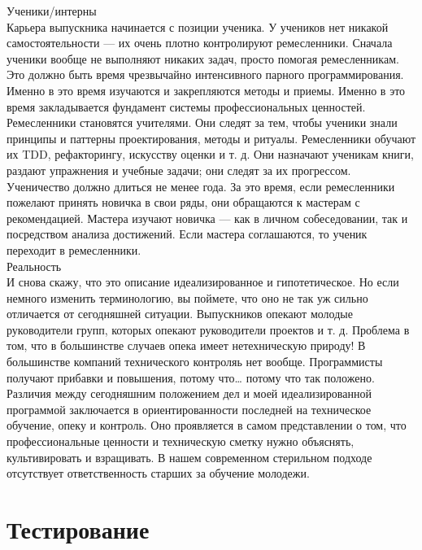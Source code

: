 \documentclass{../industrial-development}
\begin{document}
Ученики/интерны\\
Карьера выпускника начинается с позиции ученика. У учеников нет никакой самостоятельности — их очень плотно контролируют ремесленники. Сначала ученики вообще не выполняют никаких задач, просто помогая ремесленникам. Это должно быть время чрезвычайно интенсивного парного программирования. Именно в это время изучаются и закрепляются методы и приемы. Именно в это время закладывается фундамент системы профессиональных ценностей.\\
Ремесленники становятся учителями. Они следят за тем, чтобы ученики знали принципы и паттерны проектирования, методы и ритуалы. Ремесленники обучают их TDD, рефакторингу, искусству оценки и т. д. Они назначают ученикам книги, раздают упражнения и учебные задачи; они следят за их прогрессом.\\
Ученичество должно длиться не менее года. За это время, если ремесленники пожелают принять новичка в свои ряды, они обращаются к мастерам с рекомендацией. Мастера изучают новичка — как в личном собеседовании, так и посредством анализа достижений. Если мастера соглашаются, то ученик переходит в ремесленники.\\
Реальность\\
И снова скажу, что это описание идеализированное и гипотетическое. Но если немного изменить терминологию, вы поймете, что оно не так уж сильно отличается от сегодняшней ситуации. Выпускников опекают молодые руководители групп, которых опекают руководители проектов и т. д. Проблема в том, что в большинстве случаев опека имеет нетехническую природу! В большинстве компаний технического контроляь нет вообще. Программисты получают прибавки и повышения, потому
что… потому что так положено.\\
Различия между сегодняшним положением дел и моей идеализированной программой заключается в ориентированности последней на техническое обучение, опеку и контроль. Оно проявляется в самом
представлении о том, что профессиональные ценности и техническую сметку нужно объяснять, культивировать и взращивать. В нашем современном стерильном подходе отсутствует ответственность старших за обучение молодежи.


\section{Тестирование}
\end{document}

